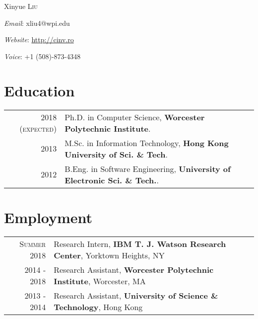 \documentclass[a4paper,10pt]{article} %
\begin{document}
\pagestyle{empty} %

\par{\Huge Xinyue \textsc{Liu}}\par %
\vspace{1.5em}
\par{ \large \emph{Email}: xliu4@wpi.edu}
\par{ \large \emph{Website}: \url{http://cinv.ro}}
\par{ \large \emph{Voice}: +1 (508)-873-4348}
\vspace{0.5em}

\section{Education}
\begin{tabular}{rl}	
\textsc{2018 (expected)} & Ph.D. in Computer Science, \textbf{Worcester Polytechnic Institute}.\\
\textsc{2013} & M.Sc. in Information Technology, \textbf{Hong Kong University of Sci. \& Tech}.\\
\textsc{2012}& B.Eng. in Software Engineering, \textbf{University of Electronic Sci. \& Tech.}.\\
\end{tabular}

\section{Employment}
\begin{tabular}{rl}
\textsc{Summer 2018} & Research Intern,    \textbf{IBM T. J. Watson Research Center}, Yorktown Heights, NY \\
\textsc{2014 - 2018} & Research Assistant, \textbf{Worcester Polytechnic Institute}, Worcester, MA  \\
\textsc{2013 - 2014} & Research Assistant, \textbf{University of Science \& Technology}, Hong Kong  \\
\end{tabular}
\end{document}
